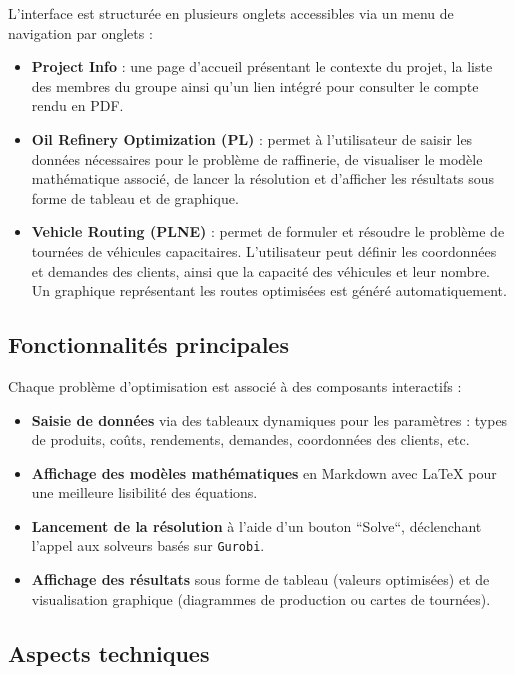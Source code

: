 \documentclass[a4paper,11pt]{article}
\begin{document}
L’interface est structurée en plusieurs onglets accessibles via un menu de navigation par onglets :
\begin{itemize}
    \item \textbf{Project Info} : une page d'accueil présentant le contexte du projet, la liste des membres du groupe ainsi qu’un lien intégré pour consulter le compte rendu en PDF.
    \item \textbf{Oil Refinery Optimization (PL)} : permet à l’utilisateur de saisir les données nécessaires pour le problème de raffinerie, de visualiser le modèle mathématique associé, de lancer la résolution et d'afficher les résultats sous forme de tableau et de graphique.
    \item \textbf{Vehicle Routing (PLNE)} : permet de formuler et résoudre le problème de tournées de véhicules capacitaires. L'utilisateur peut définir les coordonnées et demandes des clients, ainsi que la capacité des véhicules et leur nombre. Un graphique représentant les routes optimisées est généré automatiquement.
\end{itemize}

\subsection{Fonctionnalités principales}

Chaque problème d’optimisation est associé à des composants interactifs :

\begin{itemize}
    \item \textbf{Saisie de données} via des tableaux dynamiques pour les paramètres : types de produits, coûts, rendements, demandes, coordonnées des clients, etc.
    \item \textbf{Affichage des modèles mathématiques} en Markdown avec LaTeX pour une meilleure lisibilité des équations.
    \item \textbf{Lancement de la résolution} à l’aide d’un bouton ``Solve``, déclenchant l’appel aux solveurs basés sur \texttt{Gurobi}.
    \item \textbf{Affichage des résultats} sous forme de tableau (valeurs optimisées) et de visualisation graphique (diagrammes de production ou cartes de tournées).
\end{itemize}

\subsection{Aspects techniques}
\end{document}
